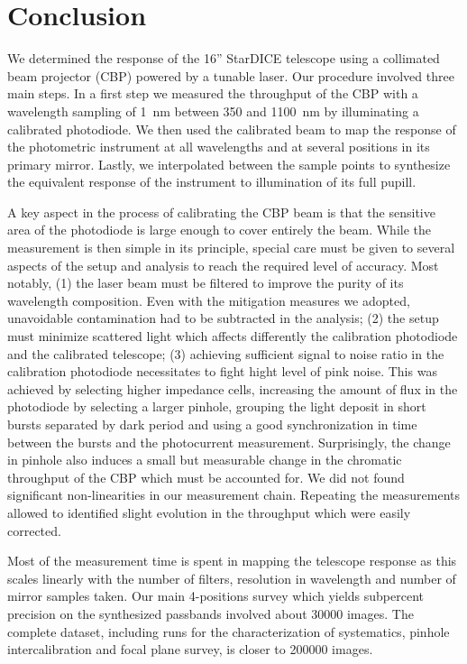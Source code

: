 \section{Conclusion}
\label{sec:discussion}

We determined the response of the 16'' StarDICE telescope using a
collimated beam projector (CBP) powered by a tunable laser. Our
procedure involved three main steps. In a first step we measured the
throughput of the CBP with a wavelength sampling of \SI{1}{nm} between
350 and \SI{1100}{nm} by illuminating a calibrated photodiode. We then
used the calibrated beam to map the response of the photometric
instrument at all wavelengths and at several positions in its primary
mirror. Lastly, we interpolated between the sample points to
synthesize the equivalent response of the instrument to illumination
of its full pupill.

A key aspect in the process of calibrating the CBP beam is that the
sensitive area of the photodiode is large enough to cover entirely the
beam. While the measurement is then simple in its principle, special
care must be given to several aspects of the setup and analysis to
reach the required level of accuracy. Most notably, (1) the laser beam
must be filtered to improve the purity of its wavelength
composition. Even with the mitigation measures we adopted, unavoidable
contamination had to be subtracted in the analysis; (2) the setup must
minimize scattered light which affects differently the calibration
photodiode and the calibrated telescope; (3) achieving sufficient
signal to noise ratio in the calibration photodiode necessitates to
fight hight level of pink noise. This was achieved by selecting higher
impedance cells, increasing the amount of flux in the photodiode by
selecting a larger pinhole, grouping the light deposit in short bursts
separated by dark period and using a good synchronization in time
between the bursts and the photocurrent measurement. Surprisingly, the
change in pinhole also induces a small but measurable change in the
chromatic throughput of the CBP which must be accounted for. We did
not found significant non-linearities in our measurement
chain. Repeating the measurements allowed to identified slight
evolution in the throughput which were easily corrected.

Most of the measurement time is spent in mapping the telescope
response as this scales linearly with the number of filters,
resolution in wavelength and number of mirror samples taken. Our main
4-positions survey which yields subpercent precision on the
synthesized passbands involved about 30000 images. The complete
dataset, including runs for the characterization of systematics,
pinhole intercalibration and focal plane survey, is closer to 200000
images.

